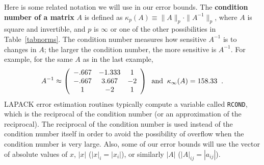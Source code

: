 Here is some related notation we will use in our error bounds.
The {\bf condition number of a matrix} $A$ is defined as
$\kappa_p (A) \equiv \|A\|_p \cdot \|A^{-1}\|_p$, where $A$
is square and invertible, and $p$ is $\infty$ or one of the other
possibilities in Table~\ref{tabnorms}. The condition number
measures how sensitive $A^{-1}$ is to changes in $A$; the larger
the condition number, the more sensitive is $A^{-1}$. For example,
for the same $A$ as in the last example,
\[
A^{-1} \approx \bmat{ccc} -.667 & -1.333 & 1 \\ -.667 & 3.667 & -2 \\ 1 & -2 & 1 \emat
\; \; {\rm and} \; \; \kappa_{\infty} (A) = 158.33 \; \; .
\]
LAPACK
error estimation routines typically compute a variable called
{\tt RCOND}, which is the reciprocal of the condition number (or an
approximation of the reciprocal). The reciprocal of the condition
number is used instead of the condition number itself in order
to avoid the possibility of overflow when the condition number is very large.
Also, some of our error bounds will use the vector of absolute values
of $x$, $|x|$ ($|x|_i = |x_i |$), or similarly $|A|$
($|A|_{ij} = |a_{ij}|$).

